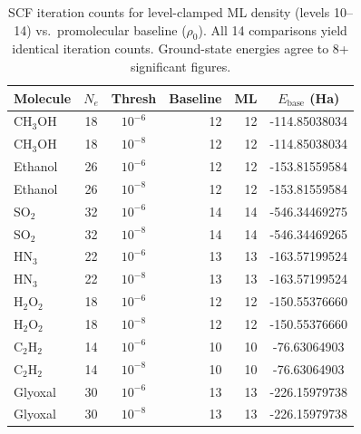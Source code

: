 \begin{table}[htbp]
\centering
\caption{SCF iteration counts for level-clamped ML density (levels 10--14) vs.\ promolecular baseline ($\rho_0$). All 14 comparisons yield identical iteration counts. Ground-state energies agree to 8+ significant figures.}
\label{tab:scf_iterations}
\begin{tabular}{lccrrc}
\toprule
Molecule & $N_e$ & Thresh & Baseline & ML & $E_\text{base}$ (Ha) \\
\midrule
CH$_3$OH & 18 & $10^{-6}$ & 12 & 12 & -114.85038034 \\
CH$_3$OH & 18 & $10^{-8}$ & 12 & 12 & -114.85038034 \\
Ethanol & 26 & $10^{-6}$ & 12 & 12 & -153.81559584 \\
Ethanol & 26 & $10^{-8}$ & 12 & 12 & -153.81559584 \\
SO$_2$ & 32 & $10^{-6}$ & 14 & 14 & -546.34469275 \\
SO$_2$ & 32 & $10^{-8}$ & 14 & 14 & -546.34469265 \\
HN$_3$ & 22 & $10^{-6}$ & 13 & 13 & -163.57199524 \\
HN$_3$ & 22 & $10^{-8}$ & 13 & 13 & -163.57199524 \\
H$_2$O$_2$ & 18 & $10^{-6}$ & 12 & 12 & -150.55376660 \\
H$_2$O$_2$ & 18 & $10^{-8}$ & 12 & 12 & -150.55376660 \\
C$_2$H$_2$ & 14 & $10^{-6}$ & 10 & 10 & -76.63064903 \\
C$_2$H$_2$ & 14 & $10^{-8}$ & 10 & 10 & -76.63064903 \\
Glyoxal & 30 & $10^{-6}$ & 13 & 13 & -226.15979738 \\
Glyoxal & 30 & $10^{-8}$ & 13 & 13 & -226.15979738 \\
\bottomrule
\end{tabular}
\end{table}
